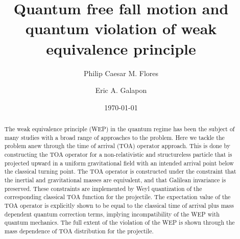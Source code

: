 \documentclass[%
 reprint,
 amsmath,amssymb,
 aps,
]{revtex4-1}
\begin{document}

\title{Quantum free fall motion and quantum violation of weak equivalence principle}%

\author{Philip Caesar M. Flores}
\author{Eric A. Galapon}%
%




\date{\today}%

\begin{abstract}
The weak equivalence principle (WEP) in the quantum regime has been the subject of many studies with a broad range of approaches to the problem. Here we tackle the problem anew through the time of arrival (TOA) operator approach.  This is done by constructing the TOA operator for a non-relativistic and structureless particle that is projected upward in a uniform gravitational field with an intended arrival point below the classical turning point. The TOA operator is constructed under the constraint that the inertial and gravitational masses are equivalent, and that Galilean invariance is preserved. These constraints are implemented by Weyl quantization of the corresponding classical TOA function for the projectile. The expectation value of the TOA operator is explicitly shown to be equal to the classical time of arrival plus mass dependent quantum correction terms, implying incompatibility of the WEP with quantum mechanics. The full extent of the violation of the WEP is shown through the mass dependence of TOA distribution for the projectile. 
\end{abstract}
\end{document}
